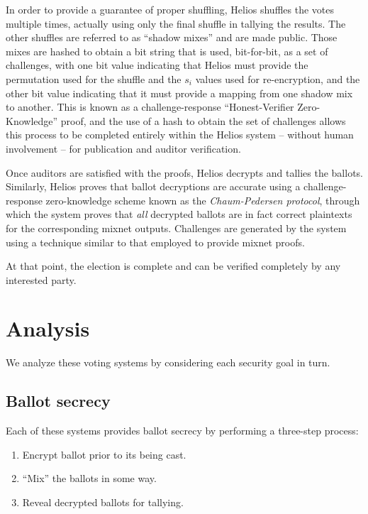 \documentclass[10pt,twocolumn]{article}
\newcommand{\term}[1]{\textit{#1}}
\begin{document}
In order to provide a guarantee of proper shuffling, Helios shuffles the votes multiple
times, actually using only the final shuffle in tallying the results. The other shuffles are
referred to as ``shadow mixes'' and are made public. Those mixes are hashed to obtain a bit string
that is used, bit-for-bit, as a set of challenges, with one bit value indicating that Helios must
provide the permutation used for the shuffle and the $s_{i}$ values used for re-encryption, and the
other bit value indicating that it must provide a mapping from one shadow mix to another. This is
known as a challenge-response ``Honest-Verifier Zero-Knowledge'' proof, and the use of a hash to
obtain the set of challenges allows this process to be completed entirely within the Helios system
-- without human involvement -- for publication and auditor verification.

Once auditors are satisfied with the proofs, Helios decrypts and tallies the ballots. Similarly,
Helios proves that ballot decryptions are accurate using a challenge-response zero-knowledge scheme
known as the \term{Chaum-Pedersen protocol}, through which the system proves that \emph{all}
decrypted ballots are in fact correct plaintexts for the corresponding mixnet outputs. Challenges
are generated by the system using a technique similar to that employed to provide mixnet proofs.

At that point, the election is complete and can be verified completely by any interested party.

\section{Analysis}

We analyze these voting systems by considering each security goal in turn.

\subsection{Ballot secrecy}

Each of these systems provides ballot secrecy by performing a three-step process:
\begin{enumerate}
	\item
		Encrypt ballot prior to its being cast.
	\item
		``Mix'' the ballots in some way.
	\item
		Reveal decrypted ballots for tallying.
\end{enumerate}
\end{document}
